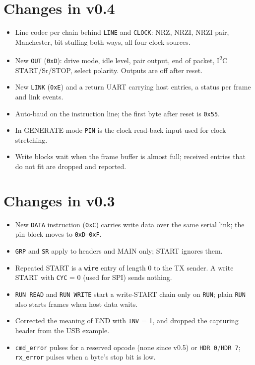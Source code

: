 \documentclass[11pt,a4paper]{article}
\newcommand{\sig}[1]{\texttt{#1}}
\begin{document}
\section{Changes in v0.4}\label{sec:changes}

\begin{itemize}
\item Line codec per chain behind \sig{LINE} and \sig{CLOCK}: NRZ, NRZI, NRZI pair, Manchester, bit stuffing both ways, all four clock sources.
\item New \sig{OUT} (\texttt{0xD}): drive mode, idle level, pair output, end of packet, I\textsuperscript{2}C START/Sr/STOP, select polarity. Outputs are off after reset.
\item New \sig{LINK} (\texttt{0xE}) and a return UART carrying host entries, a status per frame and link events.
\item Auto-baud on the instruction line; the first byte after reset is \texttt{0x55}.
\item In GENERATE mode \sig{PIN} is the clock read-back input used for clock stretching.
\item Write blocks wait when the frame buffer is almost full; received entries that do not fit are dropped and reported.
\end{itemize}

\section{Changes in v0.3}

\begin{itemize}
\item New \sig{DATA} instruction (\texttt{0xC}) carries write data over the same serial link; the pin block moves to \texttt{0xD}--\texttt{0xF}.
\item \sig{GRP} and \sig{SR} apply to headers and MAIN only; START ignores them.
\item Repeated START is a \sig{wire} entry of length 0 to the TX sender. A write START with \sig{CYC} = 0 (used for SPI) sends nothing.
\item \sig{RUN READ} and \sig{RUN WRITE} start a write-START chain only on \sig{RUN}; plain \sig{RUN} also starts frames when host data waits.
\item Corrected the meaning of END with \sig{INV} = 1, and dropped the capturing header from the USB example.
\item \sig{cmd\_error} pulses for a reserved opcode (none since v0.5) or \sig{HDR 0}/\sig{HDR 7}; \sig{rx\_error} pulses when a byte's stop bit is low.
\end{itemize}
\end{document}
